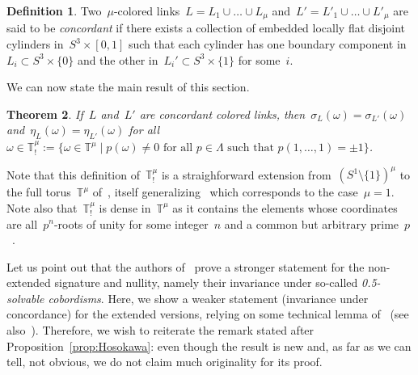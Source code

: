 \documentclass{amsart}
\newcommand{\T}{\mathbb{T}}
\newtheorem{thm}{Theorem}[section]
\theoremstyle{definition}
\newtheorem{definition}[thm]{Definition}
\theoremstyle{remark}
\begin{document}
\begin{definition}
	\label{def:concordance}
	Two~$\mu$-colored links~$L=L_1\cup\dots\cup L_\mu$ and~$L'=L'_1\cup\dots\cup L'_\mu$ are said to be {\em concordant\/} if there exists a collection of embedded locally flat disjoint cylinders in~$S^3\times [0,1]$ such that each cylinder has one boundary component
	in~$L_i\subset S^3\times\{0\}$ and the other in~$L_i'\subset S^3\times \{1\}$ for some~$i$.
\end{definition}

We can now state the main result of this section.

\begin{thm}
	\label{thm:conc}
	If~$L$ and~$L'$ are concordant colored links, then~$\sigma_L(\omega)=\sigma_{L'}(\omega)$ and~$\eta_L(\omega)=\eta_{L'}(\omega)$ for all~$\omega\in\T^\mu_!:=\{\omega\in\T^\mu\mid p(\omega)\neq 0 \text{ for all $p\in\Lambda$ such that $p(1,\dots,1)=\pm 1$}\}$.
\end{thm}

Note that this definition of~$\T^\mu_!$ is a straighforward extension from~$(S^1\setminus\{1\})^\mu$ to the full torus~$\T^\mu$
of~\cite[Definition~2.14]{CNT}, itself generalizing~\cite{NP17} which corresponds to the case~$\mu=1$.
Note also that~$\T^\mu_!$ is dense in~$\T^\mu$ as it contains the elements whose
coordinates are all~$p^n$-roots of unity for some integer~$n$ and a common but arbitrary prime~$p$~\cite[Proposition~2.17]{CNT}.

Let us point out that the authors of~\cite{CNT} prove a stronger statement for the non-extended signature and nullity, namely their invariance under so-called {\em 0.5-solvable cobordisms\/}.
Here, we show a weaker statement (invariance under concordance) for the extended versions, relying on some technical lemma of~\cite{CNT} (see also~\cite{NP17,COT03}).
Therefore, we wish to reiterate the remark stated after Proposition~\ref{prop:Hosokawa}: even though the result is new and,
as far as we can tell, not obvious, we do not claim much originality for its proof.
\end{document}
